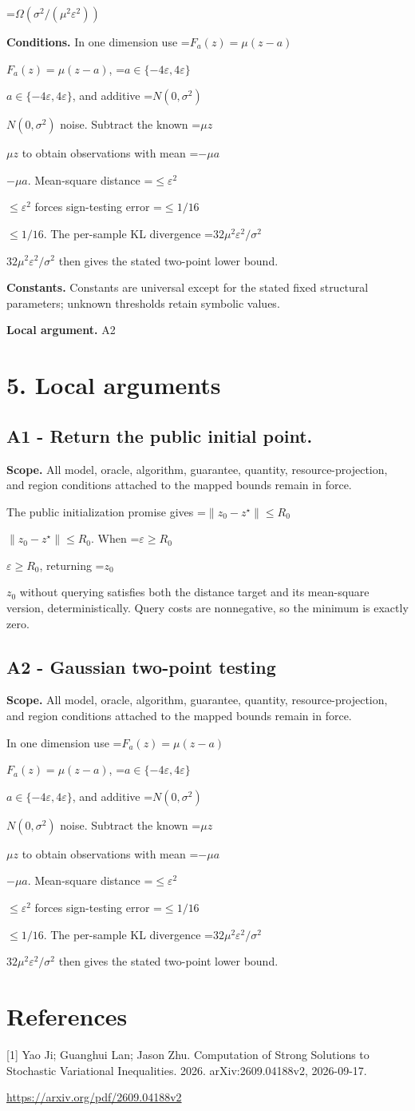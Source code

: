 \documentclass[10pt,a4paper]{article}
\newcommand{\AtlasMath}[1]{\par\begingroup\centering\setbox0=\hbox{$\displaystyle #1$}\ifdim\wd0>1.4\linewidth\typeout{ATLAS WIDE FORMULA: \the\wd0}\fi\ifdim\wd0>\linewidth\resizebox{\linewidth}{!}{\box0}\else\box0\fi\par\endgroup}
\newcommand{\AtlasInlineMath}[1]{\begingroup\setbox0=\hbox{$#1$}\ifdim\wd0>.4\linewidth\endgroup\AtlasMath{#1}\else\endgroup$#1$\fi}
\begin{document}
\AtlasMath{\Omega(\sigma^2/(\mu^2\varepsilon^2))}
\textbf{Conditions.} In one dimension use \AtlasInlineMath{F_a(z)=\mu(z-a)}, \AtlasInlineMath{a\in\{-4\varepsilon,4\varepsilon\}}, and additive \AtlasInlineMath{N(0,\sigma^2)} noise. Subtract the known \AtlasInlineMath{\mu z} to obtain observations with mean \AtlasInlineMath{-\mu a}. Mean-square distance \AtlasInlineMath{\le\varepsilon^2} forces sign-testing error \AtlasInlineMath{\le1/16}. The per-sample KL divergence \AtlasInlineMath{32\mu^2\varepsilon^2/\sigma^2} then gives the stated two-point lower bound.

\textbf{Constants.} Constants are universal except for the stated fixed structural parameters; unknown thresholds retain symbolic values.

\textbf{Local argument.} A2

\section{5. Local arguments}
\subsection{A1 - Return the public initial point.}
\textbf{Scope.} All model, oracle, algorithm, guarantee, quantity, resource-projection, and region conditions attached to the mapped bounds remain in force.

The public initialization promise gives \AtlasInlineMath{\|z_0-z^\star\|\le R_0}. When \AtlasInlineMath{\varepsilon\ge R_0}, returning \AtlasInlineMath{z_0} without querying satisfies both the distance target and its mean-square version, deterministically. Query costs are nonnegative, so the minimum is exactly zero.

\subsection{A2 - Gaussian two-point testing}
\textbf{Scope.} All model, oracle, algorithm, guarantee, quantity, resource-projection, and region conditions attached to the mapped bounds remain in force.

In one dimension use \AtlasInlineMath{F_a(z)=\mu(z-a)}, \AtlasInlineMath{a\in\{-4\varepsilon,4\varepsilon\}}, and additive \AtlasInlineMath{N(0,\sigma^2)} noise. Subtract the known \AtlasInlineMath{\mu z} to obtain observations with mean \AtlasInlineMath{-\mu a}. Mean-square distance \AtlasInlineMath{\le\varepsilon^2} forces sign-testing error \AtlasInlineMath{\le1/16}. The per-sample KL divergence \AtlasInlineMath{32\mu^2\varepsilon^2/\sigma^2} then gives the stated two-point lower bound.

\section{References}
[1] Yao Ji; Guanghui Lan; Jason Zhu. Computation of Strong Solutions to Stochastic Variational Inequalities. 2026. arXiv:2609.04188v2, 2026-09-17.

\url{https://arxiv.org/pdf/2609.04188v2}
\end{document}
